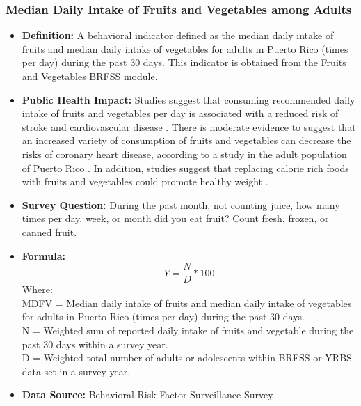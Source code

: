 \documentclass[12pt,letterpaper]{report}
\begin{document}
		\subsubsection{Median Daily Intake of Fruits and Vegetables among Adults} 
	\begin{itemize}
		\item \textbf{Definition:} A behavioral indicator defined as the median daily intake of fruits and median daily intake of vegetables for adults in Puerto Rico (times per day) during the past 30 days. This indicator is obtained from the Fruits and Vegetables BRFSS module.
		\item \textbf{Public Health Impact:} Studies suggest that consuming recommended daily intake of fruits and vegetables per day is associated with a reduced risk of stroke \cite{he2006fruit} and cardiovascular disease \cite{bazzano2002fruit}. There is moderate evidence to suggest that an increased variety of consumption of fruits and vegetables can decrease the risks of coronary heart disease, according to a study in the adult population of Puerto Rico \cite{bhupathiraju2011greater}. In addition, studies suggest that replacing calorie rich foods with fruits and vegetables could promote healthy weight \cite{rolls2004can}. 
		\item \textbf{Survey Question:} During the past month, not counting juice, how many times per day, week, or month did you eat fruit? Count fresh, frozen, or canned fruit.
		\item \textbf{Formula:} 
			\begin{equation}
				Y = \frac{N}{D} *100
			\end{equation}
Where: \\
			MDFV = Median daily intake of fruits and median daily intake of vegetables for adults in Puerto Rico (times per day) during the past 30 days. \\
			
			N = Weighted sum of reported daily intake of fruits and vegetable during the past 30 days within a survey year.\\
			
			D = Weighted total number of adults or adolescents within BRFSS or YRBS data set in a survey year.\\
			
		\item \textbf{Data Source:} Behavioral Risk Factor Surveillance Survey
	\end{itemize}
	
\end{document}
